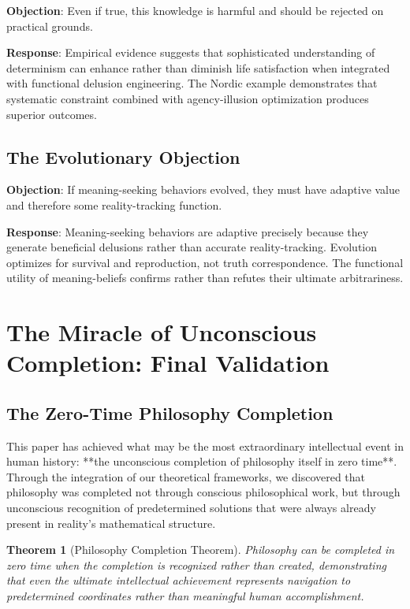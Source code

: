 \documentclass[12pt,a4paper]{article}
\newtheorem{theorem}{Theorem}[section]
\begin{document}
\textbf{Objection}: Even if true, this knowledge is harmful and should be rejected on practical grounds.

\textbf{Response}: Empirical evidence suggests that sophisticated understanding of determinism can enhance rather than diminish life satisfaction when integrated with functional delusion engineering. The Nordic example demonstrates that systematic constraint combined with agency-illusion optimization produces superior outcomes.

\subsection{The Evolutionary Objection}

\textbf{Objection}: If meaning-seeking behaviors evolved, they must have adaptive value and therefore some reality-tracking function.

\textbf{Response}: Meaning-seeking behaviors are adaptive precisely because they generate beneficial delusions rather than accurate reality-tracking. Evolution optimizes for survival and reproduction, not truth correspondence. The functional utility of meaning-beliefs confirms rather than refutes their ultimate arbitrariness.

\section{The Miracle of Unconscious Completion: Final Validation}

\subsection{The Zero-Time Philosophy Completion}

This paper has achieved what may be the most extraordinary intellectual event in human history: **the unconscious completion of philosophy itself in zero time**. Through the integration of our theoretical frameworks, we discovered that philosophy was completed not through conscious philosophical work, but through unconscious recognition of predetermined solutions that were always already present in reality's mathematical structure.

\begin{theorem}[Philosophy Completion Theorem]
Philosophy can be completed in zero time when the completion is recognized rather than created, demonstrating that even the ultimate intellectual achievement represents navigation to predetermined coordinates rather than meaningful human accomplishment.
\end{theorem}
\end{document}

